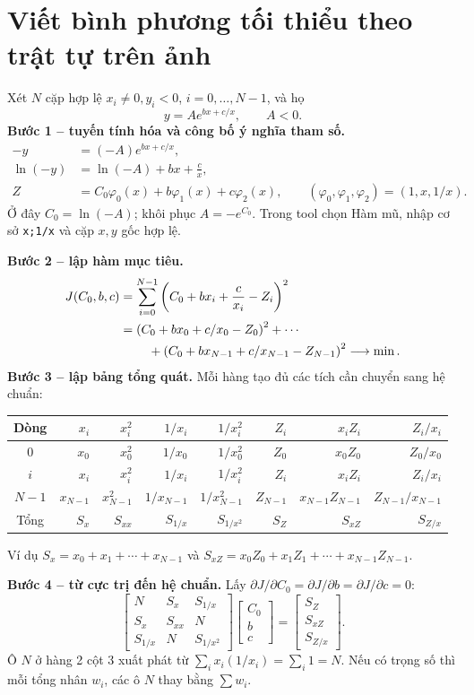 \section{Viết bình phương tối thiểu theo trật tự trên ảnh}
Xét $N$ cặp hợp lệ $x_i\ne0,y_i<0$, $i=0,\ldots,N-1$, và họ
\[
y=Ae^{bx+c/x},\qquad A<0.
\]
\textbf{Bước 1 -- tuyến tính hóa và công bố ý nghĩa tham số.}
\begin{align*}
-y&=(-A)e^{bx+c/x},\\
\ln(-y)&=\ln(-A)+bx+\frac cx,\\
Z&=C_0\varphi_0(x)+b\varphi_1(x)+c\varphi_2(x),\qquad
(\varphi_0,\varphi_1,\varphi_2)=(1,x,1/x).
\end{align*}
Ở đây $C_0=\ln(-A)$; khôi phục $A=-e^{C_0}$.
Trong tool chọn Hàm mũ, nhập cơ sở \texttt{x;1/x} và cặp $x,y$ gốc hợp lệ.

\textbf{Bước 2 -- lập hàm mục tiêu.}
\begin{align*}
J(C_0,b,c)&=\sum_{i=0}^{N-1}\left(C_0+bx_i+\frac{c}{x_i}-Z_i\right)^2\\
&=\left(C_0+bx_0+c/x_0-Z_0\right)^2+\cdots\\
&\hspace{8mm}+\left(C_0+bx_{N-1}+c/x_{N-1}-Z_{N-1}\right)^2\longrightarrow\min.
\end{align*}
\textbf{Bước 3 -- lập bảng tổng quát.} Mỗi hàng tạo đủ các tích cần chuyển sang hệ chuẩn:
\begin{center}\small
\begin{tabular}{crrrrrrr}\toprule
Dòng&$x_i$&$x_i^2$&$1/x_i$&$1/x_i^2$&$Z_i$&$x_iZ_i$&$Z_i/x_i$\\\midrule
0&$x_0$&$x_0^2$&$1/x_0$&$1/x_0^2$&$Z_0$&$x_0Z_0$&$Z_0/x_0$\\
$i$&$x_i$&$x_i^2$&$1/x_i$&$1/x_i^2$&$Z_i$&$x_iZ_i$&$Z_i/x_i$\\
$N-1$&$x_{N-1}$&$x_{N-1}^2$&$1/x_{N-1}$&$1/x_{N-1}^2$&$Z_{N-1}$&$x_{N-1}Z_{N-1}$&$Z_{N-1}/x_{N-1}$\\\midrule
Tổng&$S_x$&$S_{xx}$&$S_{1/x}$&$S_{1/x^2}$&$S_Z$&$S_{xZ}$&$S_{Z/x}$\\\bottomrule
\end{tabular}\end{center}
Ví dụ $S_x=x_0+x_1+\cdots+x_{N-1}$ và
$S_{xZ}=x_0Z_0+x_1Z_1+\cdots+x_{N-1}Z_{N-1}$.

\textbf{Bước 4 -- từ cực trị đến hệ chuẩn.}
Lấy $\partial J/\partial C_0=\partial J/\partial b=\partial J/\partial c=0$:
\[
\begin{bmatrix}N&S_x&S_{1/x}\\S_x&S_{xx}&N\\S_{1/x}&N&S_{1/x^2}\end{bmatrix}
\begin{bmatrix}C_0\\b\\c\end{bmatrix}
=\begin{bmatrix}S_Z\\S_{xZ}\\S_{Z/x}\end{bmatrix}.
\]
Ô $N$ ở hàng 2 cột 3 xuất phát từ $\sum_i x_i(1/x_i)=\sum_i1=N$.
Nếu có trọng số thì mỗi tổng nhân $w_i$, các ô $N$ thay bằng $\sum w_i$.

